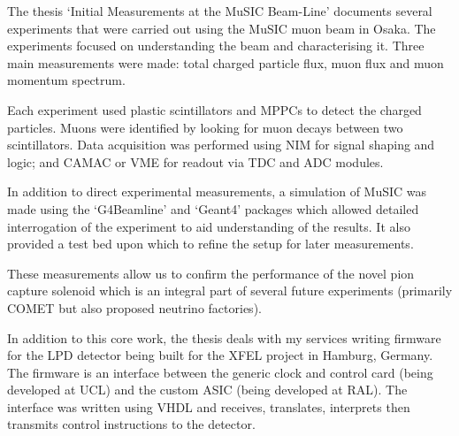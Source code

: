 \documentclass[12pt]{book}
\begin{document}
      The thesis `Initial Measurements at the MuSIC Beam-Line' documents several experiments that were carried out using the MuSIC muon beam in Osaka. The experiments focused on understanding the beam and characterising it. Three main measurements were made: total charged particle flux, muon flux and muon momentum spectrum. 

      Each experiment used plastic scintillators and MPPCs to detect the charged particles. Muons were identified by looking for muon decays between two scintillators. Data acquisition was performed using NIM for signal shaping and logic; and CAMAC or VME for readout via TDC and ADC modules. 

      In addition to direct experimental measurements, a simulation of MuSIC was made using the `G4Beamline' and `Geant4' packages which allowed detailed interrogation of the experiment to aid understanding of the results.  It also provided a test bed upon which to refine the setup for later measurements. 

      These measurements allow us to confirm the performance of the novel pion capture solenoid which is an integral part of several future experiments (primarily COMET but also proposed neutrino factories).

      In addition to this core work, the thesis deals with my services writing firmware for the LPD detector being built for the XFEL project in Hamburg, Germany. The firmware is an interface between the generic clock and control card (being developed at UCL) and the custom ASIC (being developed at RAL). The interface was written using VHDL and receives, translates, interprets then transmits control instructions to the detector.
    
    
    \tableofcontents

    \listoffigures
    \listoftables
    
    
    
    
    
    
    
    
    
\end{document}
